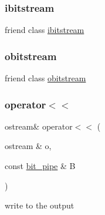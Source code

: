 \subsubsection{\texorpdfstring{ibitstream}{ibitstream}}
{\footnotesize\ttfamily friend class \hyperlink{classibitstream}{ibitstream}\hspace{0.3cm}{\ttfamily [friend]}}

\mbox{\label{classbit__pipe_a8f65a774c3f7ab2392033a7cf4a170ad}} 
\subsubsection{\texorpdfstring{obitstream}{obitstream}}
{\footnotesize\ttfamily friend class \hyperlink{classobitstream}{obitstream}\hspace{0.3cm}{\ttfamily [friend]}}

\mbox{\label{classbit__pipe_a1fd08251d1f9f0ac5e24f3e90962f59a}} 
\subsubsection{\texorpdfstring{operator$<$$<$}{operator<<}\hspace{0.1cm}{\footnotesize\ttfamily [1/2]}}
{\footnotesize\ttfamily ostream\& operator$<$$<$ (\begin{DoxyParamCaption}\item[{ostream \&}]{o,  }\item[{const \hyperlink{classbit__pipe}{bit\+\_\+pipe} \&}]{B }\end{DoxyParamCaption})\hspace{0.3cm}{\ttfamily [friend]}}



write to the output 


